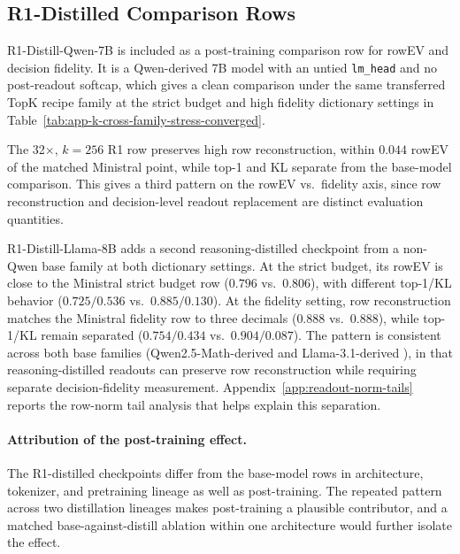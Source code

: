 \ReadoutSAEFloatBarrier
\subsection{R1-Distilled Comparison Rows}
\label{app:readout-factorizer-r1-distill-comparison}

R1-Distill-Qwen-7B is included as a post-training comparison row for
rowEV and decision fidelity. It is a Qwen-derived 7B model with an untied
\texttt{lm\_head} and no post-readout softcap, which gives a clean comparison under the same
transferred TopK recipe family at the strict budget and high fidelity dictionary
settings in
Table~\ref{tab:app-k-cross-family-stress-converged}.

The 32$\times$, $k=256$ R1 row preserves high row reconstruction, within
$0.044$ rowEV of the matched Ministral point, while top-1 and KL separate from
the base-model comparison. This gives a third pattern on the rowEV vs.\ fidelity
axis, since row reconstruction and decision-level readout replacement are distinct
evaluation quantities.

R1-Distill-Llama-8B adds a second reasoning-distilled checkpoint from a
non-Qwen base family at both dictionary settings. At the strict budget, its
rowEV is close to the Ministral strict budget row ($0.796$ vs.\ $0.806$), with
different top-1/KL behavior ($0.725/0.536$ vs.\ $0.885/0.130$). At the fidelity
setting, row reconstruction matches the Ministral fidelity row to three decimals
($0.888$ vs.\ $0.888$), while top-1/KL remain separated ($0.754/0.434$ vs.\
$0.904/0.087$). The pattern is consistent across both base families
(Qwen2.5-Math-derived \citep{yang2024qwen25math} and Llama-3.1-derived
\citep{grattafiori2024llama3herd}), in that reasoning-distilled readouts can preserve
row reconstruction while requiring separate decision-fidelity
measurement. Appendix~\ref{app:readout-norm-tails} reports the row-norm tail
analysis that helps explain this separation.

\paragraph{Attribution of the post-training effect.}
The R1-distilled checkpoints differ from the base-model rows in architecture,
tokenizer, and pretraining lineage as well as post-training. The repeated pattern
across two distillation lineages makes post-training a plausible contributor, and a
matched base-against-distill ablation within one architecture would further isolate
the effect.

